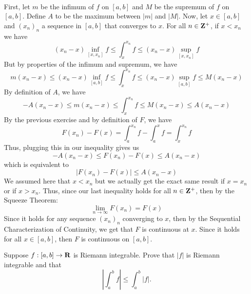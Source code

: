 \begin{solution}
    \\ First, let $m$ be the infimum of $f$ on $[a,b]$ and $M$ be the supremum of $f$ on $[a,b]$. Define $A$ to be the maximum between $|m|$ and $|M|$. Now, let $x \in [a,b]$ and $(x_n)_n$ a sequence in $[a,b]$ that converges to $x$. For all $n \in \mathbf{Z}^+$, if $x < x_n$ we have
    $$(x_n - x)\inf_{[x, x_n]}f \leq \int_{x}^{x_n}f \leq (x_n - x)\sup_{[x, x_n]}f$$
    But by properties of the infimum and supremum, we have
    $$m(x_n - x) \leq (x_n - x)\inf_{[a,b]}f \leq \int_{x}^{x_n}f \leq (x_n - x)\sup_{[a,b]}f \leq M(x_n - x)$$
    By definition of $A$, we have
    $$-A(x_n - x) \leq m(x_n - x) \leq \int_{x}^{x_n}f \leq M(x_n - x) \leq A(x_n - x)$$
    By the previous exercise and by definition of $F$, we have
    $$F(x_n) - F(x) = \int_{a}^{x_n}f - \int_{a}^{x}f = \int_{x}^{x_n}f$$
    Thus, plugging this in our inequality gives us 
    $$-A(x_n - x) \leq F(x_n) - F(x) \leq A(x_n - x)$$
    which is equivalent to
    $$|F(x_n) - F(x)| \leq A(x_n - x)$$
    We assumed here that $x < x_n$ but we actually get the exact same result if $x = x_n$ or if $x > x_n$. Thus, since our last inequality holds for all $n \in \mathbf{Z}^+$, then by the Squeeze Theorem:
    $$\lim_{n \rightarrow \infty}F(x_n) = F(x)$$
    Since it holds for any sequence $(x_n)_n$ converging to $x$, then by the Sequential Characterization of Continuity, we get that $F$ is continuous at $x$. Since it holds for all $x \in [a,b]$, then $F$ is continuous on $[a,b]$. \\
\end{solution}

 \begin{exercise}
    Suppose $f:[a,b] \to \mathbf{R}$ is Riemann integrable. Prove that $|f|$ is Riemann integrable and that
    $$\left| \int_{a}^{b}f \right| \leq \int_{a}^{b}|f|.$$
 \end{exercise}

